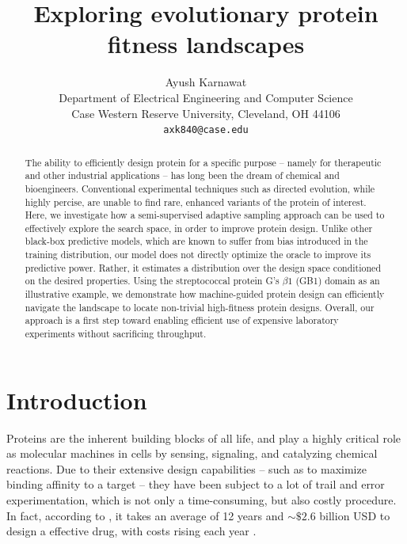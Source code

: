 \documentclass{article}
\title{Exploring evolutionary protein fitness landscapes}
\author{
  Ayush Karnawat \\
  Department of Electrical Engineering and Computer Science \\
  Case Western Reserve University,
  Cleveland, OH 44106 \\
  \texttt{axk840@case.edu} \\
}
\begin{document}
\maketitle

\begin{abstract}
  The ability to efficiently design protein for a specific purpose -- namely for
  therapeutic and other industrial applications -- has long been the dream of
  chemical and bioengineers. Conventional experimental techniques such as
  directed evolution, while highly percise, are unable to find rare, enhanced
  variants of the protein of interest. Here, we investigate how a
  semi-supervised adaptive sampling approach can be used to effectively explore
  the search space, in order to improve protein design. Unlike other black-box
  predictive models, which are known to suffer from bias introduced in the
  training distribution, our model does not directly optimize the oracle to
  improve its predictive power. Rather, it estimates a distribution over the
  design space conditioned on the desired properties. Using the streptococcal
  protein G's $\beta 1$ (GB1) domain as an illustrative example, we demonstrate
  how machine-guided protein design can efficiently navigate the landscape to
  locate non-trivial high-fitness protein designs. Overall, our approach is a
  first step toward enabling efficient use of expensive laboratory experiments
  without sacrificing throughput.
\end{abstract}


\section{Introduction}
Proteins are the inherent building blocks of all life, and play a highly
critical role as molecular machines in cells by sensing, signaling, and
catalyzing chemical reactions. Due to their extensive design capabilities
\cite{dahiyat1997novo, jackel2008protein} -- such as to maximize binding
affinity to a target -- they have been subject to a lot of trail and error
experimentation, which is not only a time-consuming, but also costly procedure.
In fact, according to \cite{dimasi2016innovation}, it takes an average of 12
years and $\sim\$2.6$ billion USD to design a effective drug, with costs rising
each year \cite{dickson2009cost}. 
\end{document}
